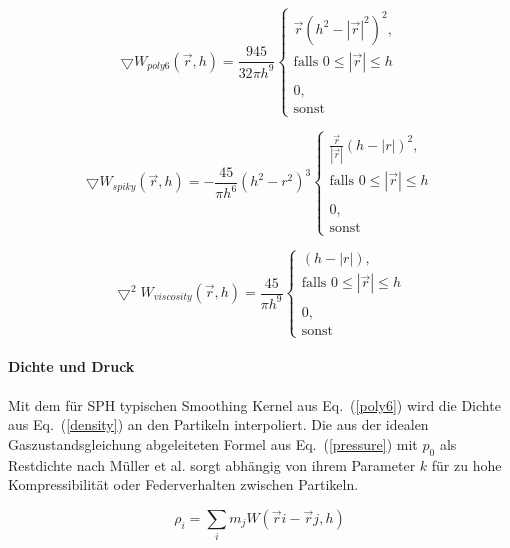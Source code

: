 \documentclass[a4paper]{paper}
\renewcommand{\eqref}[1]{Eq.~(\ref{#1})}
\begin{document}
\begin{equation}
\label{gradient_poly6}
\bigtriangledown W_{poly6}(\vec{r},h) = \frac{945}{32 \pi h^9} 
\begin{cases}
\vec{r}(h^2-|\vec{r}|^2)^2, \\ \text{falls } 0 \leq |\vec{r}| \leq h  \\
\\
0, \\ \text{sonst}
\end{cases}
\end{equation}

\begin{equation}
\label{spiky}
\bigtriangledown W_{spiky}(\vec{r},h) = -\frac{45}{\pi h^6} (h^2-r^2)^3
\begin{cases}
\frac{\vec{r}}{|\vec{r}|}(h-|r|)^2, \\ \text{falls } 0 \leq |\vec{r}| \leq h\\

\\ 0, \\ \text{sonst}
\end{cases}
\end{equation}

\begin{equation}
\label{viscosity}
\bigtriangledown^2 W_{viscosity}(\vec{r},h) = \frac{45}{\pi h^9} 
\begin{cases}
(h-|r|),

\\ \text{falls } 0 \leq |\vec{r}| \leq h \\
\\
0, 
\\ \text{sonst}
\end{cases}
\end{equation}


\paragraph{Dichte und Druck}
Mit dem für SPH typischen Smoothing Kernel aus \eqref{poly6} wird die Dichte aus  \eqref{density} an den Partikeln interpoliert.
Die aus der idealen Gaszustandsgleichung abgeleiteten Formel aus \eqref{pressure} mit $p_0$ als Restdichte nach Müller et al. \citep{muller2003particle} sorgt abhängig von ihrem Parameter $k$ für zu hohe Kompressibilität oder Federverhalten zwischen Partikeln.

\begin{equation}
\label{density}
\rho_i = \sum_i{m_j W(\vec{r}{i}-\vec{r}{j},h)}
\end{equation}
\end{document}
